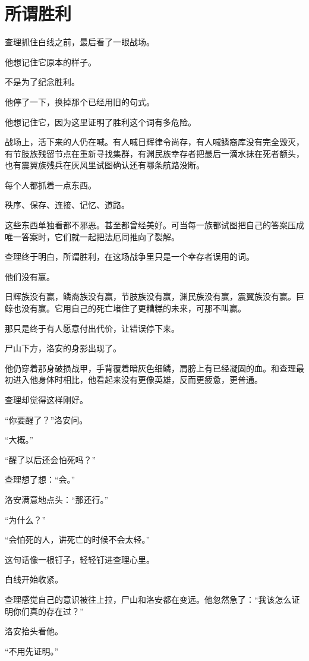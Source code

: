 \chapter{所谓胜利}

查理抓住白线之前，最后看了一眼战场。

他想记住它原本的样子。

不是为了纪念胜利。

他停了一下，换掉那个已经用旧的句式。

他想记住它，因为这里证明了胜利这个词有多危险。

战场上，活下来的人仍在喊。有人喊日辉律令尚存，有人喊鳞裔库没有完全毁灭，有节肢族残留节点在重新寻找集群，有渊民族幸存者把最后一滴水抹在死者额头，也有震翼族残兵在灰风里试图确认还有哪条航路没断。

每个人都抓着一点东西。

秩序、保存、连接、记忆、道路。

这些东西单独看都不邪恶。甚至都曾经美好。可当每一族都试图把自己的答案压成唯一答案时，它们就一起把法厄同推向了裂解。

查理终于明白，所谓胜利，在这场战争里只是一个幸存者误用的词。

他们没有赢。

日辉族没有赢，鳞裔族没有赢，节肢族没有赢，渊民族没有赢，震翼族没有赢。巨鲸也没有赢。它用自己的死亡堵住了更糟糕的未来，可那不叫赢。

那只是终于有人愿意付出代价，让错误停下来。

尸山下方，洛安的身影出现了。

他仍穿着那身破损战甲，手背覆着暗灰色细鳞，肩膀上有已经凝固的血。和查理最初进入他身体时相比，他看起来没有更像英雄，反而更疲惫，更普通。

查理却觉得这样刚好。

“你要醒了？”洛安问。

“大概。”

“醒了以后还会怕死吗？”

查理想了想：“会。”

洛安满意地点头：“那还行。”

“为什么？”

“会怕死的人，讲死亡的时候不会太轻。”

这句话像一根钉子，轻轻钉进查理心里。

白线开始收紧。

查理感觉自己的意识被往上拉，尸山和洛安都在变远。他忽然急了：“我该怎么证明你们真的存在过？”

洛安抬头看他。

“不用先证明。”

